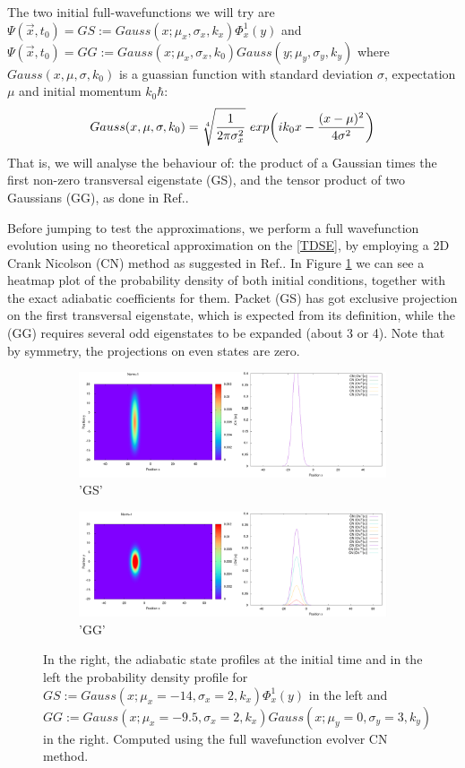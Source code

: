 \documentclass[11pt, a4paper]{article} %
\begin{document}
The two initial full-wavefunctions we will try are $\Psi(\vec{x},t_0)=GS:=Gauss(x;\mu_x, \sigma_x, k_x)\Phi^1_x(y)$ and $\Psi(\vec{x},t_0)=GG:=Gauss(x; \mu_x, \sigma_x, k_0)Gauss(y; \mu_y, \sigma_y, k_y)$ where $Gauss(x,\mu, \sigma, k_0)$ is a guassian function with standard deviation $\sigma$, expectation $\mu$ and initial momentum $k_0\hbar$:
$$
Gauss(x,\mu,\sigma,k_0)=\sqrt[4]{\frac{1}{2\pi \sigma_x^2}}\ exp\qty(ik_0x-\frac{(x-\mu)^2}{4\sigma^2})
$$
That is, we will analyse the behaviour of: the product of a Gaussian times the first non-zero transversal eigenstate (GS), and the tensor product of two Gaussians (GG), as done in Ref.\cite{Dev}. 

Before jumping to test the approximations, we perform a full wavefunction evolution using no theoretical approximation on the \ref{TDSE}, by employing a 2D Crank Nicolson (CN) method as suggested in Ref.\cite{nireTFGie}. In Figure \ref{fig:population} we can see a heatmap plot of the probability density of both initial conditions, together with the exact adiabatic coefficients for them. Packet (GS) has got exclusive projection on the first transversal eigenstate, which is expected from its definition, while the (GG) requires several odd eigenstates to be expanded (about 3 or 4). Note that by symmetry, the projections on even states are zero.\vspace{-0.3cm}

\begin{figure}[h!]
  \centering
  \begin{subfigure}[b]{0.7\linewidth}
    \includegraphics[width=\linewidth]{GS_inik.png}
    \caption{'GS'}
  \end{subfigure}
  \begin{subfigure}[b]{0.7\linewidth}
    \includegraphics[width=\linewidth]{GG_inik.png}
    \caption{'GG'}
  \end{subfigure}

  \caption{ In the right, the adiabatic state profiles at the initial time and in the left the probability density profile for $GS:=Gauss(x;\mu_x=-14, \sigma_x=2, k_x)\Phi^1_x(y)$ in the left and  $GG:=Gauss(x;\mu_x=-9.5, \sigma_x=2, k_x)Gauss(x;\mu_y=0, \sigma_y=3, k_y)$ in the right. Computed using the full wavefunction evolver CN method.}
  \label{fig:population}
\end{figure}
\end{document}

